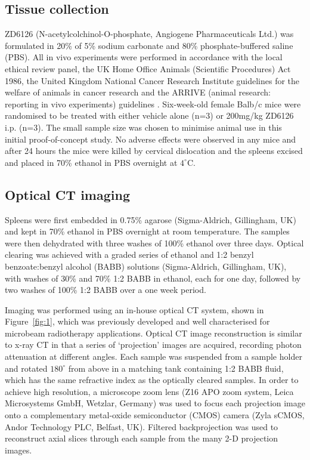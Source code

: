 \documentclass[12pt]{article}
\begin{document}
\subsection{Tissue collection}
ZD6126 (N-acetylcolchinol-O-phosphate, Angiogene Pharmaceuticals Ltd.) was formulated in 20\% of 5\% sodium carbonate and 80\% phosphate-buffered saline (PBS). 
All in vivo experiments were performed in accordance with the local ethical review panel, the UK Home Office Animals (Scientific Procedures) Act 1986, the United Kingdom National Cancer Research Institute guidelines for the welfare of animals in cancer research \cite{workman2010guidelines} and the ARRIVE (animal research: reporting in vivo experiments) guidelines \cite{mcgrath2010guidelines}. Six-week-old female Balb/c mice were randomised to be treated with either vehicle alone (n=3) or 200mg/kg ZD6126 i.p. (n=3). The small sample size was chosen to minimise animal use in this initial proof-of-concept study. No adverse effects were observed in any mice and after 24 hours the mice were killed by cervical dislocation and the spleens excised and placed in 70\% ethanol in PBS overnight at $4^{\circ}$C.

\subsection{Optical CT imaging}
Spleens were first embedded in 0.75\% agarose (Sigma-Aldrich, Gillingham, UK) and kept in 70\% ethanol in PBS overnight at room temperature. The samples were then dehydrated with three washes of 100\% ethanol over three days. Optical clearing was achieved with a graded series of ethanol and 1:2 benzyl benzoate:benzyl alcohol (BABB) solutions (Sigma-Aldrich, Gillingham, UK), with washes of 30\% and 70\% 1:2 BABB in ethanol, each for one day, followed by two washes of 100\% 1:2 BABB over a one week period. 

Imaging was performed using an in-house optical CT system, shown in Figure~\ref{fig:1}, which was previously developed and well characterised for microbeam radiotherapy applications. \cite{doranestablishing2013} Optical CT image reconstruction is similar to x-ray CT in that a series of `projection' images are acquired, recording photon attenuation at different angles. Each sample was suspended from a sample holder and rotated $180^{\circ}$ from above in a matching tank containing 1:2 BABB fluid, which has the same refractive index as the optically cleared samples. In order to achieve high resolution, a microscope zoom lens (Z16 APO zoom system, Leica Microsystems GmbH, Wetzlar, Germany) was used to focus each projection image onto a complementary metal-oxide semiconductor (CMOS) camera (Zyla sCMOS, Andor Technology PLC, Belfast, UK). Filtered backprojection was used to reconstruct axial slices through each sample from the many 2-D projection images. 
\end{document}
